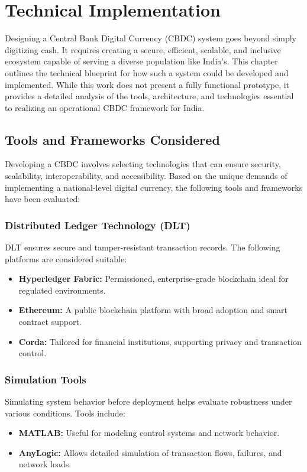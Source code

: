 
\chapter{Technical Implementation}
\label{chp5}

Designing a Central Bank Digital Currency (CBDC) system goes beyond simply digitizing cash. It requires creating a secure, efficient, scalable, and inclusive ecosystem capable of serving a diverse population like India's. This chapter outlines the technical blueprint for how such a system could be developed and implemented. While this work does not present a fully functional prototype, it provides a detailed analysis of the tools, architecture, and technologies essential to realizing an operational CBDC framework for India.

\section{Tools and Frameworks Considered}
Developing a CBDC involves selecting technologies that can ensure security, scalability, interoperability, and accessibility. Based on the unique demands of implementing a national-level digital currency, the following tools and frameworks have been evaluated:

\subsection*{Distributed Ledger Technology (DLT)}
DLT ensures secure and tamper-resistant transaction records. The following platforms are considered suitable:
\begin{itemize}
    \item \textbf{Hyperledger Fabric:} Permissioned, enterprise-grade blockchain ideal for regulated environments.
    \item \textbf{Ethereum:} A public blockchain platform with broad adoption and smart contract support.
    \item \textbf{Corda:} Tailored for financial institutions, supporting privacy and transaction control.
\end{itemize}

\subsection*{Simulation Tools}
Simulating system behavior before deployment helps evaluate robustness under various conditions. Tools include:
\begin{itemize}
    \item \textbf{MATLAB:} Useful for modeling control systems and network behavior.
    \item \textbf{AnyLogic:} Allows detailed simulation of transaction flows, failures, and network loads.
\end{itemize}


